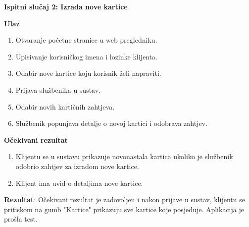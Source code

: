 		\textbf{Ispitni slučaj 2: Izrada nove kartice} 
		
		\textbf{Ulaz}
		
		\begin{enumerate}
			
			\item Otvaranje početne stranice u web pregledniku.
			\item Upisivanje korisničkog imena i lozinke klijenta.
			\item Odabir nove kartice koju korisnik želi napraviti.
			\item Prijava službenika u sustav.
			\item Odabir novih kartičnih zahtjeva.
			\item Službenik popunjava detalje o novoj kartici i odobrava zahtjev.
		\end{enumerate}
		
		\textbf{Očekivani rezultat}
		
		\begin{enumerate}
			\item Klijentu se u sustavu prikazuje novonastala kartica ukoliko je službenik odobrio zahtjev za izradom nove kartice.
			\item Klijent ima uvid o detaljima nove kartice.
		\end{enumerate}
		
		\textbf{Rezultat}: Očekivani rezultat je zadovoljen i nakon prijave u sustav, klijentu se pritiskom na gumb "Kartice" prikazuju sve kartice koje posjeduje. Aplikacija je prošla test.
		
